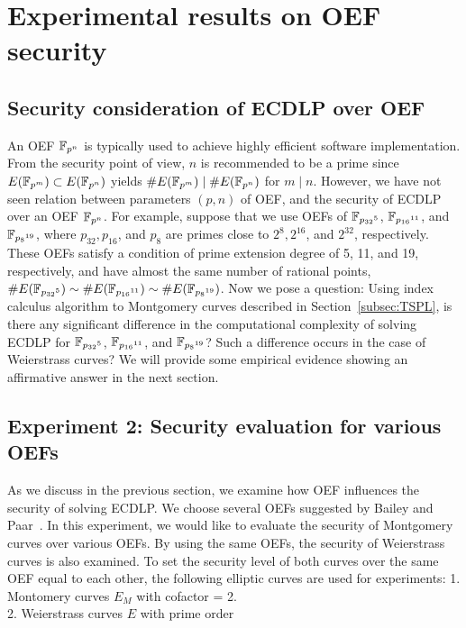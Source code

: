 %
\section{Experimental results on OEF security}
%
\label{sec:experiments-OEF}
%
\subsection{Security consideration of ECDLP over OEF}
%
An OEF ${\mathbb F}_{p^n}$ is typically used to achieve highly efficient software
implementation.
%
From the security point of view, $n$ is recommended to be a prime
since $E({\mathbb F}_{p^m}) \subset E({\mathbb F}_{p^n})$ yields $\#E({\mathbb F}_{p^m}) \mid \# E({\mathbb F}_{p^n})$ for
$m \mid n$.
%
However, we have not seen relation between parameters $(p, n)$ of OEF,
and the security of ECDLP over an OEF ${\mathbb F}_{p^n}$.
%
For example, suppose that we use OEFs of $\mathbb F_{{p_{32}}^5}$,
$\mathbb F_{{p_{16}}^{11}}$, and $\mathbb F_{{p_{8}}^{19}}$, where $p_{32}, p_{16}$,
and $p_{8}$ are primes close to $2^8, 2^{16}$, and $2^{32}$,
respectively.
%
These OEFs satisfy a condition of prime extension degree of 5, 11, and
19, respectively, and have almost the same number of rational points,
$\#E(\mathbb F_{{p_{32}}^5}) \sim \#E(\mathbb F_{{p_{16}}^{11}}) \sim
\#E(\mathbb F_{{p_{8}}^{19}})$.
%
Now we pose a question: Using index calculus algorithm to Montgomery 
curves described in Section~\ref{subsec:TSPL}, is there any significant 
difference in the
computational complexity of solving ECDLP for $\mathbb F_{{p_{32}}^5}$,
$\mathbb F_{{p_{16}}^{11}}$, and $\mathbb F_{{p_{8}}^{19}}$?
%
Such a difference occurs in the case of Weierstrass curves?
We will provide some empirical evidence showing an affirmative answer
in the next section.


\subsection{Experiment 2: Security evaluation for various OEFs}
%
As we discuss in the previous section, we examine how OEF influences the
security of solving ECDLP.
We choose several OEFs suggested by Bailey and
Paar~\cite{DBLP:conf/crypto/BaileyP98}.
In this experiment, we would like to evaluate the security of
Montgomery curves over various OEFs.  By using the same OEFs,  
the security of Weierstrass curves is also examined.
To set the security level of both curves over the same OEF equal to 
each other, the following elliptic curves are used for experiments:
1. Montomery curves $E_M$ with cofactor = 2.  \\
2. Weierstrass curves $E$ with prime order

